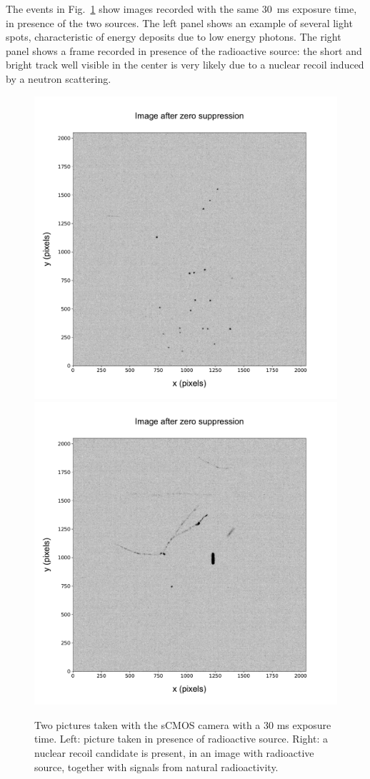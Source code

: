 \documentclass[12pt]{iopart}
\begin{document}
The events in Fig.~\ref{fig:signals} show images recorded with the
same 30~ms exposure time, in presence of the two sources. The left
panel shows an example of several light spots, characteristic of
energy deposits due to \fe low energy photons.  The right panel shows
a frame recorded in presence of the \ambe radioactive source: the
short and bright track well visible in the center is very likely
due to a nuclear recoil induced by a neutron scattering.
% 
\begin{figure}[ht]
  \begin{center}
    \includegraphics[width=0.49\linewidth]{figures/pic_run01843_ev93_oriIma_paper}
    \includegraphics[width=0.49\linewidth]{figures/pic_run02317_ev342_oriIma_paper}
    \caption{Two pictures taken with the sCMOS camera with a 30 ms
      exposure time. Left: picture taken in presence of \fe radioactive
      source. Right: a nuclear recoil candidate is present, in an image
      with \ambe radioactive source, together with signals from natural
      radioactivity.      \label{fig:signals}}
  \end{center}
\end{figure}




\clearpage
 
\end{document}

